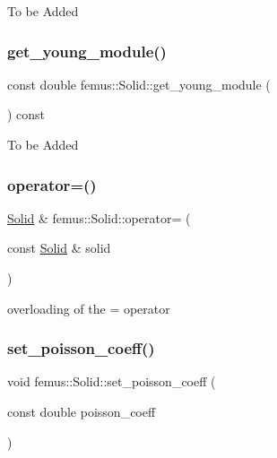 To be Added \mbox{\label{classfemus_1_1_solid_a1a27599fb327424255b0823dcddd863a}} 
\subsubsection{\texorpdfstring{get\+\_\+young\+\_\+module()}{get\_young\_module()}}
{\footnotesize\ttfamily const double femus\+::\+Solid\+::get\+\_\+young\+\_\+module (\begin{DoxyParamCaption}{ }\end{DoxyParamCaption}) const}

To be Added \mbox{\label{classfemus_1_1_solid_a6fa24eaf6a7378872f2cd9b440f72a9f}} 
\subsubsection{\texorpdfstring{operator=()}{operator=()}}
{\footnotesize\ttfamily \mbox{\hyperlink{classfemus_1_1_solid}{Solid}} \& femus\+::\+Solid\+::operator= (\begin{DoxyParamCaption}\item[{const \mbox{\hyperlink{classfemus_1_1_solid}{Solid}} \&}]{solid }\end{DoxyParamCaption})}

overloading of the = operator \mbox{\label{classfemus_1_1_solid_a1e30ce159ef4011c26fdfe3dfe0f05a0}} 
\subsubsection{\texorpdfstring{set\+\_\+poisson\+\_\+coeff()}{set\_poisson\_coeff()}}
{\footnotesize\ttfamily void femus\+::\+Solid\+::set\+\_\+poisson\+\_\+coeff (\begin{DoxyParamCaption}\item[{const double}]{poisson\+\_\+coeff }\end{DoxyParamCaption})}

